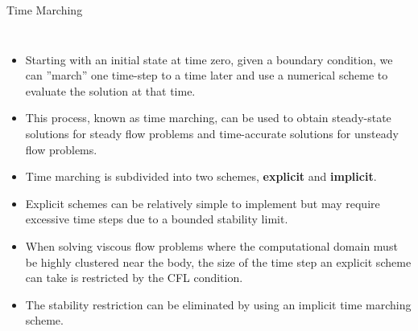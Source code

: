 \begin{frame}{Time Marching}
  \begin{columns}
    \begin{itemize}
      \item Starting with an initial state at time zero, given a boundary condition, we can 
            ”march” one time-step to a time later and use a numerical scheme to evaluate the 
            solution at that time.
      \item This process, known as time marching, can be used to obtain steady-state solutions 
            for steady flow problems and time-accurate solutions for unsteady flow problems.
      \item Time marching is subdivided into two schemes, \textbf{explicit} and \textbf{implicit}.
      \item Explicit schemes can be relatively simple to implement but may require excessive 
            time steps due to a bounded stability limit.
      \item When solving viscous flow problems where the computational domain must be highly 
            clustered near the body, the size of the time step an explicit scheme can take is 
            restricted by the CFL condition. 
      \item The stability restriction can be eliminated by using an implicit time marching scheme.
    \end{itemize}   
  \end{columns}
\end{frame}

